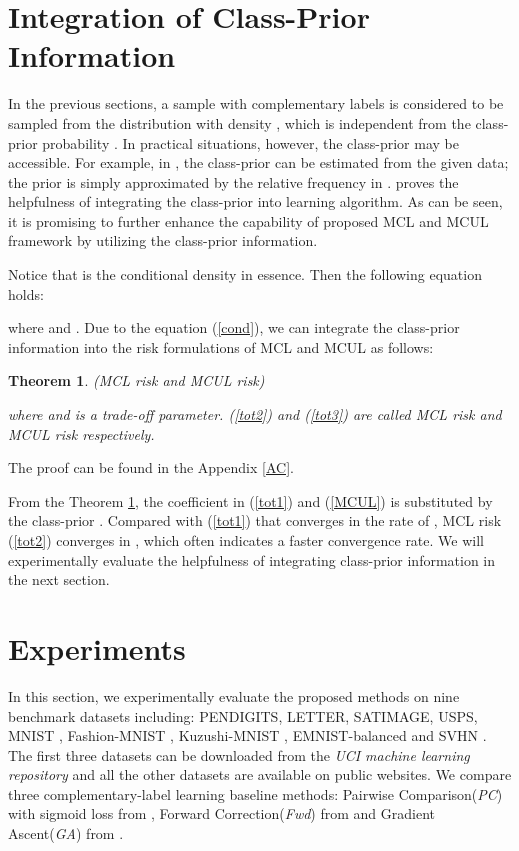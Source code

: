 \documentclass[]{article} \usepackage{geometry}
\newtheorem{theorem}{Theorem}
\begin{document}
\section{Integration of Class-Prior Information}
In the previous sections, a sample with  complementary labels is considered to be sampled from the distribution with density , which is independent from the class-prior probability . In practical situations, however, the class-prior may be accessible. For example, in \cite{CR}, the class-prior can be estimated from the given data; the prior is simply approximated by the relative frequency in \cite{DBLP:conf/icml/IshidaNMS19}. \cite{PUPN} proves the helpfulness of integrating the class-prior into learning algorithm. As can be seen, it is promising to further enhance the capability of proposed MCL and MCUL framework by utilizing the class-prior information.

Notice that  is the conditional density  in essence. Then the following equation holds:

where  and .
Due to the equation (\ref{cond}), we can integrate the class-prior information into the risk formulations of MCL and MCUL as follows:
\begin{theorem}(MCL risk and MCUL risk)
\label{CPI}

where  and  is a trade-off parameter. (\ref{tot2}) and (\ref{tot3}) are called MCL risk and MCUL risk respectively.
\end{theorem}
The proof can be found in the Appendix \ref{AC}.

From the Theorem \ref{CPI}, the coefficient  in (\ref{tot1}) and (\ref{MCUL}) is substituted by the class-prior . Compared with (\ref{tot1}) that converges in the rate of , MCL risk (\ref{tot2}) converges in , which often indicates a faster convergence rate. We will experimentally evaluate the helpfulness of integrating class-prior information in the next section.
\section{Experiments}




In this section, we experimentally evaluate the proposed methods on nine benchmark datasets including: PENDIGITS, LETTER, SATIMAGE, USPS, MNIST \cite{MNIST}, Fashion-MNIST \cite{FMNIST}, Kuzushi-MNIST \cite{kmnist}, EMNIST-balanced \cite{EMNIST} and SVHN \cite{SVHN}. The first three datasets can be downloaded from the \textit{UCI machine learning repository} and all the other datasets are available on public websites. We compare three complementary-label learning baseline methods: Pairwise Comparison(\textit{PC}) with sigmoid loss from \cite{DBLP:conf/nips/IshidaNHS17}, Forward Correction(\textit{Fwd}) from \cite{DBLP:conf/eccv/YuLGT18} and Gradient Ascent(\textit{GA}) from \cite{DBLP:conf/icml/IshidaNMS19}.
\end{document}
